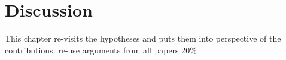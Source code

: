 \chapter{Discussion}
This chapter re-visits the hypotheses and puts them into perspective of the contributions.
re-use arguments from all papers
20\%

